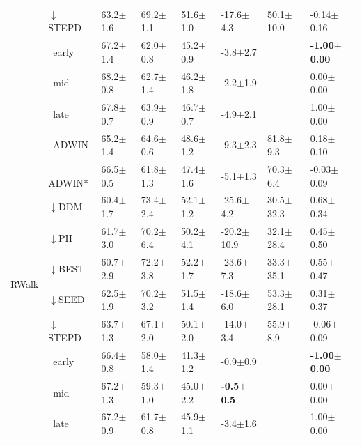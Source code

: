 \begin{tabular}{llllllll}
 & $\downarrow$STEPD & 63.2\tiny{$\pm$1.6} & 69.2\tiny{$\pm$1.1} & 51.6\tiny{$\pm$1.0} & -17.6\tiny{$\pm$4.3} & 50.1\tiny{$\pm$10.0} & -0.14\tiny{$\pm$0.16} \\
 & $\ \;$early & 67.2\tiny{$\pm$1.4} & 62.0\tiny{$\pm$0.8} & 45.2\tiny{$\pm$0.9} & -3.8\tiny{$\pm$2.7} &  & \textbf{-1.00\tiny{$\pm$0.00}} \\
 & $\ \;$mid & 68.2\tiny{$\pm$0.8} & 62.7\tiny{$\pm$1.4} & 46.2\tiny{$\pm$1.8} & -2.2\tiny{$\pm$1.9} &  & 0.00\tiny{$\pm$0.00} \\
 & $\ \;$late & 67.8\tiny{$\pm$0.7} & 63.9\tiny{$\pm$0.9} & 46.7\tiny{$\pm$0.7} & -4.9\tiny{$\pm$2.1} &  & 1.00\tiny{$\pm$0.00} \\
\midrule
\multirow[t]{10}{*}{RWalk} & $\ \;$ADWIN & 65.2\tiny{$\pm$1.4} & 64.6\tiny{$\pm$0.6} & 48.6\tiny{$\pm$1.2} & -9.3\tiny{$\pm$2.3} & 81.8\tiny{$\pm$9.3} & 0.18\tiny{$\pm$0.10} \\
 & $\ \;$ADWIN* & 66.5\tiny{$\pm$0.5} & 61.8\tiny{$\pm$1.3} & 47.4\tiny{$\pm$1.6} & -5.1\tiny{$\pm$1.3} & 70.3\tiny{$\pm$6.4} & -0.03\tiny{$\pm$0.09} \\
 & $\downarrow$DDM & 60.4\tiny{$\pm$1.7} & 73.4\tiny{$\pm$2.4} & 52.1\tiny{$\pm$1.2} & -25.6\tiny{$\pm$4.2} & 30.5\tiny{$\pm$32.3} & 0.68\tiny{$\pm$0.34} \\
 & $\downarrow$PH & 61.7\tiny{$\pm$3.0} & 70.2\tiny{$\pm$6.4} & 50.2\tiny{$\pm$4.1} & -20.2\tiny{$\pm$10.9} & 32.1\tiny{$\pm$28.4} & 0.45\tiny{$\pm$0.50} \\
 & $\downarrow$BEST & 60.7\tiny{$\pm$2.9} & 72.2\tiny{$\pm$3.8} & 52.2\tiny{$\pm$1.7} & -23.6\tiny{$\pm$7.3} & 33.3\tiny{$\pm$35.1} & 0.55\tiny{$\pm$0.47} \\
 & $\downarrow$SEED & 62.5\tiny{$\pm$1.9} & 70.2\tiny{$\pm$3.2} & 51.5\tiny{$\pm$1.4} & -18.6\tiny{$\pm$6.0} & 53.3\tiny{$\pm$28.1} & 0.31\tiny{$\pm$0.37} \\
 & $\downarrow$STEPD & 63.7\tiny{$\pm$1.3} & 67.1\tiny{$\pm$2.0} & 50.1\tiny{$\pm$2.0} & -14.0\tiny{$\pm$3.4} & 55.9\tiny{$\pm$8.9} & -0.06\tiny{$\pm$0.09} \\
 & $\ \;$early & 66.4\tiny{$\pm$0.8} & 58.0\tiny{$\pm$1.4} & 41.3\tiny{$\pm$1.2} & -0.9\tiny{$\pm$0.9} &  & \textbf{-1.00\tiny{$\pm$0.00}} \\
 & $\ \;$mid & 67.2\tiny{$\pm$1.3} & 59.3\tiny{$\pm$1.0} & 45.0\tiny{$\pm$2.2} & \textbf{-0.5\tiny{$\pm$0.5}} &  & 0.00\tiny{$\pm$0.00} \\
 & $\ \;$late & 67.2\tiny{$\pm$0.9} & 61.7\tiny{$\pm$0.8} & 45.9\tiny{$\pm$1.1} & -3.4\tiny{$\pm$1.6} &  & 1.00\tiny{$\pm$0.00} \\

\end{tabular}
